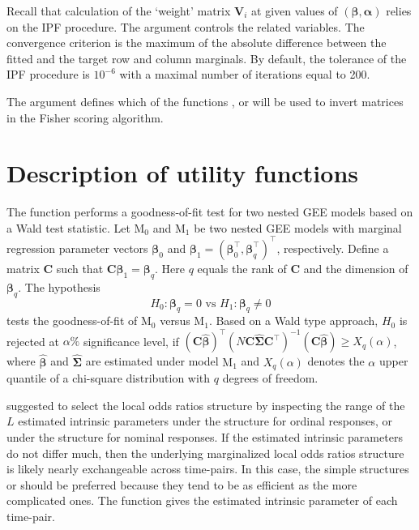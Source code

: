 \documentclass[article,shortnames,nojss]{jss}
\begin{document}
Recall that calculation of the `weight' matrix $\mathbf V_i$ at given values of $(\boldsymbol \beta,\boldsymbol \alpha)$ relies on the IPF procedure. The  argument controls the related variables. The convergence criterion is the maximum of the absolute difference between the fitted and the target row and column marginals. By default, the tolerance of the IPF procedure is $10^{-6}$ with a maximal number of iterations equal to 200.

The  argument defines which of the  functions ,  or  will be used to invert matrices in the Fisher scoring algorithm. 

\section{Description of utility functions}\label{Description2}
The function  performs a goodness-of-fit test for two nested GEE models based on a Wald test statistic. Let $\mathrm{M_0}$ and $\mathrm{M_1}$ be two nested GEE models with marginal regression parameter vectors $\boldsymbol \beta_0$ and $\boldsymbol \beta_1=(\boldsymbol \beta_0^{\top},\boldsymbol \beta^{\top}_q)^{\top}$, respectively. Define a matrix $\mathbf C$ such that $\mathbf C \boldsymbol \beta_1=\boldsymbol \beta_q$. Here $q$ equals the rank of $\mathbf C$ and the dimension of $\boldsymbol \beta_q$. The hypothesis  
$$H_0: \boldsymbol \beta_q=0 \text{ vs } H_1: \boldsymbol \beta_q \neq 0$$
tests the goodness-of-fit of $\mathrm{M_0}$ versus $\mathrm{M_1}$. Based on a Wald type approach, $H_0$ is rejected at $\alpha \%$ significance level, if $(\mathbf C \widehat{\boldsymbol \beta})^{\top} (N\mathbf C \widehat{\boldsymbol \Sigma}\mathbf C^{\top})^{-1}(\mathbf C \widehat{\boldsymbol \beta}) \geq X_{q}(\alpha)$, where $\widehat{\boldsymbol \beta}$ and $\widehat{\boldsymbol \Sigma}$ are estimated under model $\mathrm{M_1}$ and $X_{q}(\alpha)$ denotes the $\alpha$ upper quantile of a chi-square distribution with $q$ degrees of freedom.

\cite{Touloumis2012} suggested to select the local odds ratios structure by inspecting the range of the $L$ estimated intrinsic parameters under the  structure for ordinal responses, or under the  structure for nominal responses. If the estimated intrinsic parameters do not differ much, then the underlying marginalized local odds ratios structure is likely nearly exchangeable across time-pairs. In this case, the simple structures  or  should be preferred because they tend to be as efficient as the more complicated ones. The function  gives the estimated intrinsic parameter of each time-pair.
\end{document}
